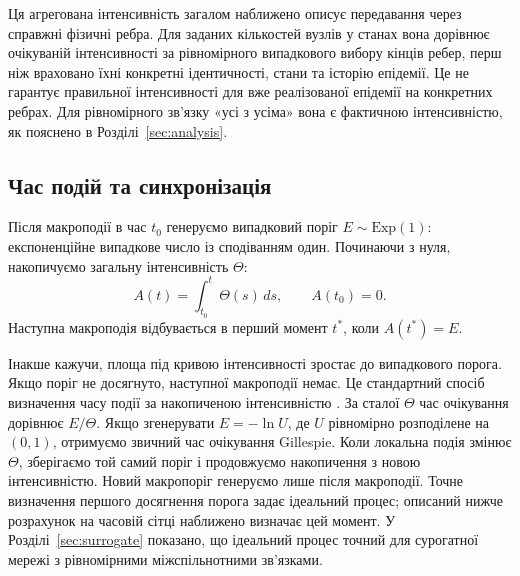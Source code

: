 \documentclass[a4paper,fleqn]{cas-sc}
\newcommand{\Exp}{\mathrm{Exp}}
\begin{document}
Ця агрегована інтенсивність загалом наближено описує передавання через справжні фізичні ребра. Для заданих кількостей вузлів у станах вона дорівнює очікуваній інтенсивності за рівномірного випадкового вибору кінців ребер, перш ніж враховано їхні конкретні ідентичності, стани та історію епідемії. Це не гарантує правильної інтенсивності для вже реалізованої епідемії на конкретних ребрах. Для рівномірного зв'язку «усі з усіма» вона є фактичною інтенсивністю, як пояснено в Розділі~\ref{sec:analysis}. 

\subsection{Час подій та синхронізація}
\label{sec:timing}

Після макроподії в час $t_0$ генеруємо випадковий поріг $E\sim\Exp(1)$: експоненційне випадкове число із сподіванням один. Починаючи з нуля, накопичуємо загальну інтенсивність $\Theta$:
\begin{equation}
\label{eq:hazard_integral}
A(t)=\int_{t_0}^{t}\Theta(s)\,ds,
\qquad A(t_0)=0.
\end{equation}
Наступна макроподія відбувається в перший момент
$t^\ast$, коли $A(t^\ast)=E$.


Інакше кажучи, площа під кривою інтенсивності зростає до випадкового порога. Якщо поріг не досягнуто, наступної макроподії немає. Це стандартний спосіб визначення часу події за накопиченою інтенсивністю \citep{ethier1986,anderson2007}. За сталої $\Theta$ час очікування дорівнює $E/\Theta$. Якщо згенерувати $E=-\ln U$, де $U$ рівномірно розподілене на $(0,1)$, отримуємо звичний час очікування Gillespie. Коли локальна подія змінює $\Theta$, зберігаємо той самий поріг і продовжуємо накопичення з новою інтенсивністю. Новий макропоріг генеруємо лише після макроподії. Точне визначення першого досягнення порога задає ідеальний процес; описаний нижче розрахунок на часовій сітці наближено визначає цей момент. У Розділі~\ref{sec:surrogate} показано, що ідеальний процес точний для сурогатної мережі з рівномірними міжспільнотними зв’язками.
\end{document}
